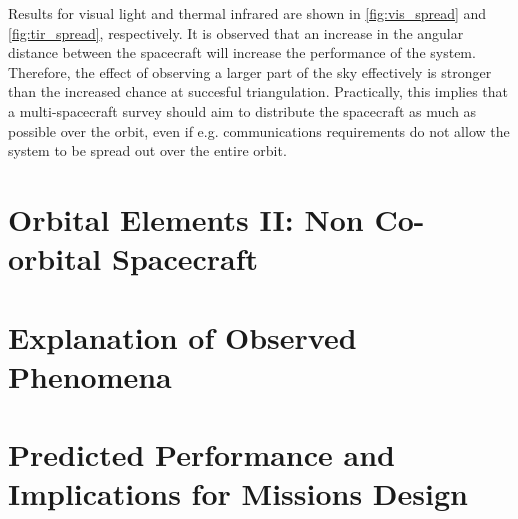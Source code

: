 Results for visual light and thermal infrared are shown in \autoref{fig:vis_spread} and \autoref{fig:tir_spread}, respectively. It is observed that an increase in the angular distance between the spacecraft will increase the performance of the system. Therefore, the effect of observing a larger part of the sky effectively is stronger than the increased chance at succesful triangulation. Practically, this implies that a multi-spacecraft survey should aim to distribute the spacecraft as much as possible over the orbit, even if e.g. communications requirements do not allow the system to be spread out over the entire orbit.

\section{Orbital Elements II: Non Co-orbital Spacecraft}
\label{sec:results_orbits_two}


\section{Explanation of Observed Phenomena}
\label{sec:results_explanation}


\section{Predicted Performance and Implications for Missions Design}
\label{sec:results_performance}
